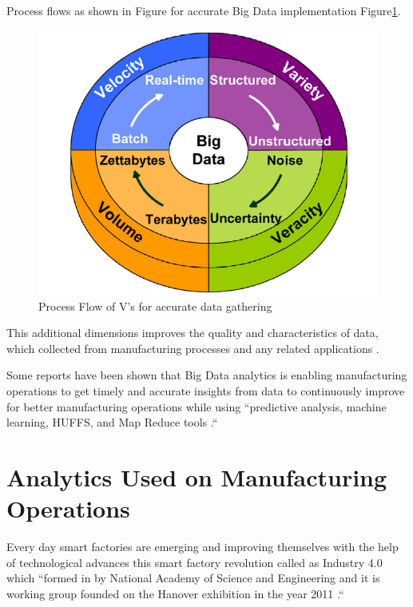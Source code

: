 \documentclass[sigconf]{acmart}
\begin{document}
\par Process flows as shown in Figure for accurate Big Data implementation Figure\ref{fig:5V}\cite{HE2017}.  

 \begin{figure}[!ht]
  \centering
      \includegraphics[width=\columnwidth]{paper2/images/5V.png}
  \caption{Process Flow of V's for accurate data gathering}\label{fig:5V}
\end{figure}
    
\par This additional dimensions improves the quality and characteristics of data, which collected from manufacturing processes and any related applications \cite{BABICEANU2016128}.
\par Some reports have been shown that Big Data analytics is enabling manufacturing operations to get timely and accurate insights from data to continuously improve for better manufacturing operations while using ``predictive analysis, machine learning, HUFFS, and Map Reduce tools \cite{BABICEANU2016128}.``  


\section{Analytics Used on Manufacturing Operations}

 Every day smart factories are emerging and improving themselves with the help of technological advances this smart factory revolution called as Industry 4.0 which ``formed in by National Academy of Science and Engineering and it is working group founded on the Hanover exhibition in the year 2011 \cite{WAGNER2017125}.`` 
\end{document}
